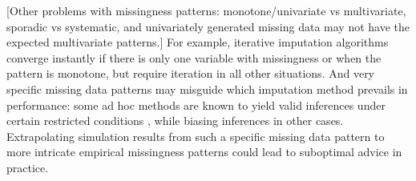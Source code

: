 \documentclass[bimj,fleqn]{w-art}
\begin{document}

[Other problems with missingness patterns: monotone/univariate vs multivariate, sporadic vs systematic, and univariately generated missing data may not have the expected multivariate patterns.] For example, iterative imputation algorithms converge instantly if there is only one variable with missingness or when the pattern is monotone, but require iteration in all other situations. And very specific missing data patterns may misguide which imputation method prevails in performance: some ad hoc methods are known to yield valid inferences under certain restricted conditions \citep[e.g., list-wise deletion may outperform imputation methods if there is missingness in the outcome variable of the analysis model exclusively][]{fimd}, while biasing inferences in other cases. Extrapolating simulation results from such a specific missing data pattern to more intricate empirical missingness patterns could lead to suboptimal advice in practice. 


\end{document}
